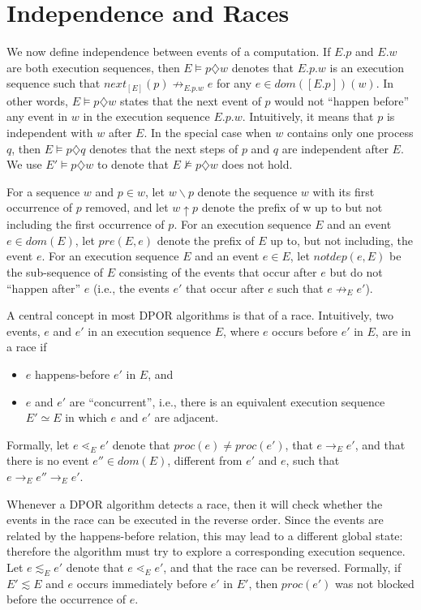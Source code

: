 \section{Independence and Races}

We now define independence between events of a computation. If
$E.p$ and $E.w$ are both execution sequences, then $E \models p\diamondsuit w$ denotes
that $E.p.w$ is an execution sequence such that $next_{[E]}(p) \not \rightarrow_{E.p.w} e$
for any $e \in dom([E.p])(w)$. In other words, $E \models p \diamondsuit w$ states that
the next event of $p$ would not “happen before” any event in $w$
in the execution sequence $E.p.w$. Intuitively, it means that $p$ is
independent with $w$ after $E$. In the special case when $w$ contains
only one process $q$, then $E \models p \diamondsuit q$ denotes that the next steps of
$p$ and $q$ are independent after $E$. We use $E'\models p \diamondsuit w$ to denote that
$E \not \models p \diamondsuit w$ does not hold.

For a sequence $w$ and $p \in w$, let $w \backslash p$ denote the sequence
$w$ with its first occurrence of $p$ removed, and let $w \uparrow p$ denote the
prefix of w up to but not including the first occurrence of $p$. For
an execution sequence $E$ and an event $e \in  dom(E)$, let $pre(E,e)$
denote the prefix of $E$ up to, but not including, the event $e$. For an
execution sequence $E$ and an event $e \in E$, let $notdep(e, E)$ be the
sub-sequence of $E$ consisting of the events that occur after $e$ but do
not “happen after” $e$ (i.e., the events $e'$ that occur after $e$ such that
$e \not \rightarrow_E e'$).


A central concept in most DPOR algorithms is that of a race.
Intuitively, two events, $e$ and $e'$ in an execution sequence $E$, where
$e$ occurs before $e'$ in $E$, are in a race if
\begin{itemize}
\item $e$ happens-before $e'$ in $E$, and
\item $e$ and $e'$ are “concurrent”, i.e., there is an equivalent execution
sequence $E' \simeq E$ in which $e$ and $e'$ are adjacent.
\end{itemize}
Formally, let $e \lessdot_E e'$ denote that $proc(e) \not = proc(e')$, that $e \rightarrow_E e'$,
and that there is no event $e'' \in dom(E)$, different from $e'$ and $e$,
such that $e \rightarrow_E e'' \rightarrow_E e'$.

Whenever a DPOR algorithm detects a race, then it will check
whether the events in the race can be executed in the reverse order.
Since the events are related by the happens-before relation, this may
lead to a different global state: therefore the algorithm must try to
explore a corresponding execution sequence. Let $e \lesssim_E e'$ denote
that $e \lessdot_E e'$, and that the race can be reversed. Formally, if $E' \lesssim E$
and $e$ occurs immediately before $e'$ in $E'$, then $proc(e')$ was not
blocked before the occurrence of $e$.


